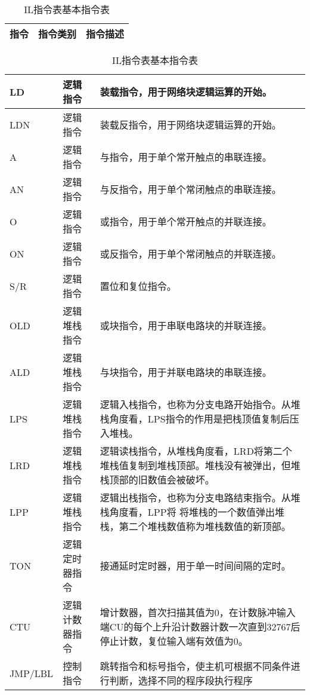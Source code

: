 \newcommand{\tabincell}[2]{\begin{tabular}{@{}#1@{}}#2\end{tabular}}
\begin{table}[!htp]
\centering
\caption{IL指令表基本指令表}
\label{spec:il}
\begin{tabular}{|p{2cm}<{\centering}|p{6cm}<{\centering}|p{6cm}<{\centering}|}
\hline
指令 & 指令类别 & 指令描述 \\
\hline
\end{tabular}
\begin{tabular}{|p{2cm}|p{4cm}|p{6cm}|}
\hline
LD & 逻辑指令 & 装载指令，用于网络块逻辑运算的开始。 \\
\hline
LDN & 逻辑指令 & 装载反指令，用于网络块逻辑运算的开始。 \\
\hline
A & 逻辑指令 & 与指令，用于单个常开触点的串联连接。 \\
\hline
AN & 逻辑指令 & 与反指令，用于单个常闭触点的串联连接。 \\
\hline
O & 逻辑指令 & 或指令，用于单个常开触点的并联连接。 \\
\hline
ON & 逻辑指令 & 或反指令，用于单个常闭触点的并联连接。 \\
\hline
S/R & 逻辑指令 & 置位和复位指令。 \\
\hline
OLD & 逻辑堆栈指令 & 或块指令，用于串联电路块的并联连接。 \\
\hline
ALD & 逻辑堆栈指令 & 与块指令，用于并联电路块的串联连接。 \\
\hline
LPS & 逻辑堆栈指令 & 逻辑入栈指令，也称为分支电路开始指令。从堆栈角度看，LPS指令的作用是把栈顶值复制后压入堆栈。\\
\hline
LRD & 逻辑堆栈指令 & 逻辑读栈指令，从堆栈角度看，LRD将第二个堆栈值复制到堆栈顶部。堆栈没有被弹出，但堆栈顶部的旧数值会被破坏。
 \\
\hline
LPP & 逻辑堆栈指令 & 逻辑出栈指令，也称为分支电路结束指令。从堆栈角度看，LPP将
将堆栈的一个数值弹出堆栈，第二个堆栈数值称为堆栈数值的新顶部。\\
\hline
TON & 逻辑定时器指令 & 接通延时定时器，用于单一时间间隔的定时。 \\
\hline
CTU & 逻辑计数器指令 & 增计数器，首次扫描其值为0，在计数脉冲输入端CU的每个上升沿计数器计数一次直到32767后停止计数，复位输入端有效值为0。 \\
\hline
JMP/LBL & 控制指令 & 跳转指令和标号指令，使主机可根据不同条件进行判断，选择不同的程序段执行程序 \\
\hline

\end{tabular}
\end{table}

